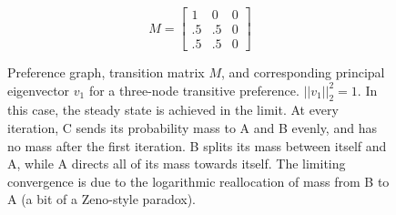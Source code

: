 \begin{figure}[!htb] %
\centering
\begin{minipage}{1.2in}
\end{minipage}
\hfill
\begin{minipage}{1.2in}
\[
M=
  \begin{bmatrix}
    1 & 0 & 0 \\
    .5 & .5 & 0 \\
    .5 & .5 & 0
  \end{bmatrix}
\]
\end{minipage}
\hfill
\begin{minipage}{1.2in}
\end{minipage}
\caption{Preference graph, transition matrix $M$, and corresponding principal eigenvector $v_1$ for a three-node transitive preference. $||v_1||_2^2 = 1$. In this case, the steady state is achieved in the limit. At every iteration, C sends its probability mass to A and B evenly, and has no mass after the first iteration. B splits its mass between itself and A, while A directs all of its mass towards itself. The limiting convergence is due to the logarithmic reallocation of mass from B to A (a bit of a Zeno-style paradox).}
\label{fig:linalg_3} 
\end{figure}



